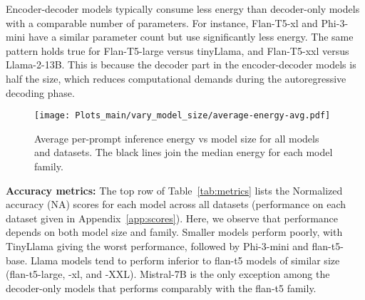 

Encoder-decoder models typically consume less energy than decoder-only models with a comparable number of parameters. 
%
For instance, Flan-T5-xl and Phi-3-mini have a similar parameter count but use significantly less energy. 
%
The same pattern holds true for Flan-T5-large versus tinyLlama, and Flan-T5-xxl versus Llama-2-13B. 
%
This is because the decoder part in the encoder-decoder models is half the size, which reduces computational demands during the autoregressive decoding phase.

%
%
%


\begin{figure}[!t]
    \centering
    \texttt{[image: Plots\_main/vary\_model\_size/average-energy-avg.pdf]}
    \caption{Average per-prompt inference energy vs model size for all models and datasets. The black lines join the median energy for each model family.}%
    \label{fig:model_size}
\end{figure}




\vspace{1mm}
\noindent \textbf{Accuracy metrics:} The top row of Table~\ref{tab:metrics} lists the Normalized accuracy (NA) scores for each model across all datasets (performance on each dataset given in Appendix~\ref{app:scores}). 
Here, we observe that performance depends on both model size and family. Smaller models perform poorly, with TinyLlama giving the worst performance, followed by Phi-3-mini and flan-t5-base. Llama models tend to perform inferior to flan-t5 models of similar size (flan-t5-large, -xl, and -XXL). Mistral-7B is the only exception among the decoder-only models that performs comparably with the flan-t5 family. 

